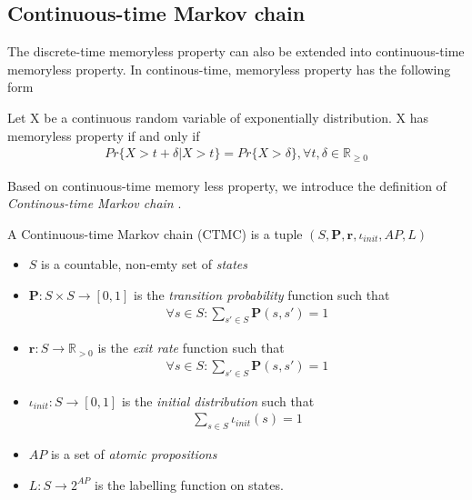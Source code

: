 \subsection{Continuous-time Markov chain}
The discrete-time memoryless property can also be extended into continuous-time memoryless property.
In continous-time, memoryless property has the following form
\begin{definition}
    Let X be a continuous random variable of exponentially distribution. X has memoryless property
    if and only if
    \begin{align*}
        Pr\{X > t + \delta | X > t\} = Pr\{X > \delta\}, \forall t,\delta \in \mathbb{R}_{\geq 0}
    \end{align*}
\end{definition}
Based on continuous-time memory less property, we introduce the definition of \textit{Continous-time
    Markov chain} \cite{baier2003model}.
\begin{definition}
    A Continuous-time Markov chain (CTMC) is a tuple $(S,\mathbf{P}, \mathbf{r}, \iota_{init}, AP, L)$
    \begin{itemize}
        \item $S$ is a countable, non-emty set of \textit{states}
        \item $\mathbf{P}:S\times S \rightarrow [0,1]$ is the \textit{transition probability}
              function such that
              \begin{align*}
                  \forall s \in S : \sum_{s'\in S}\mathbf{P}(s, s') = 1
              \end{align*}
        \item $\mathbf{r}:S \rightarrow \mathbb{R}_{>0}$ is the \textit{exit rate} function
              such that
              \begin{align*}
                  \forall s \in S : \sum_{s'\in S}\mathbf{P}(s, s') = 1
              \end{align*}
        \item $\iota_{init}: S \rightarrow [0,1]$ is the \textit{initial distribution} such that
              \begin{align*}
                  \sum_{s\in S}\iota_{init}(s) = 1
              \end{align*}
        \item $AP$ is a set of \textit{atomic propositions}
        \item $L: S \rightarrow 2^{AP}$ is the labelling function on states.
    \end{itemize}
\end{definition}

